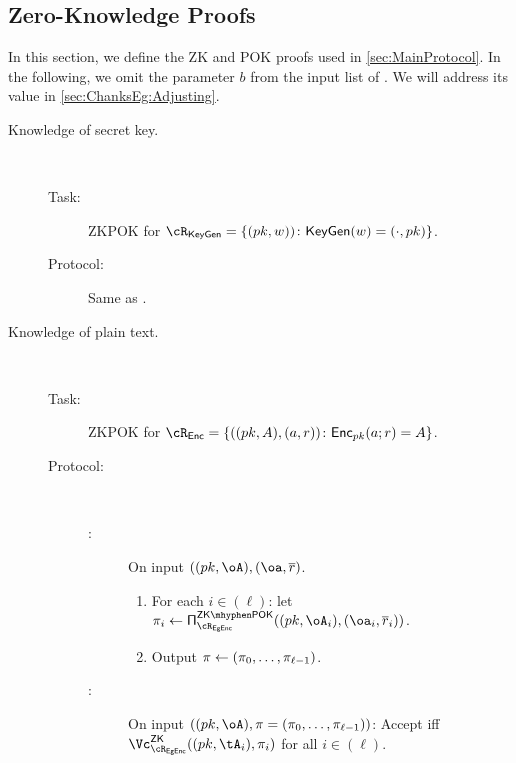 \subsection{Zero-Knowledge  Proofs }\label{sec:ChanksEg:Proofs}
In this section, we define the ZK and POK proofs used in  \cref{sec:MainProtocol}.
In the following, we omit the parameter $b$ from the input list of  \Dec.  We will address its value in \cref{sec:ChanksEg:Adjusting}.


\begin{description}
	\item[Knowledge of secret key.] ~
	
	\begin{description}
		\item[Task:] ZKPOK for $\rKeyGen=\rKeyGenDef$.
		
		\item[Protocol:] Same as \piZKPOK{\rEgKeyGen}. 
		
	\end{description}
	
	
	\item[Knowledge of plain text.] ~
	
	

	\begin{description}
		\item[Task:] ZKPOK for $\rEnc=\rEncDef$.
		
		\item[Protocol:]~
		
		\begin{description}
			\item[\Pc:] On  input  $((\pk,\oA),(\oa,\orr)$.
			\begin{enumerate}
				\item For each $i\in (\ell)$: let  $\pi_i \asn \piZKPOK{\rEgEnc}((\pk,\oA_i),(\oa_i,\orr_i))$. 
				
				\item Output $\pi \leftarrow (\pi_0,\ldots, \pi_{\ell-1})$.
				
			\end{enumerate}
			
			
			\item[\Vc:] On  input  $((\pk,\oA),\pi = (\pi_0,\ldots, \pi_{\ell-1}))$: Accept iff  $\vZK{\rEgEnc}((\pk,\tA_i), \pi_i)$ for all $i\in (\ell)$.
			
		\end{description} 
		
		
	\end{description}
	

\end{description}
